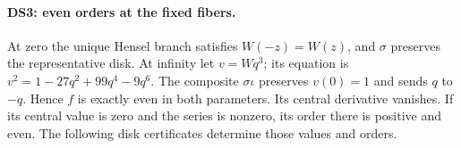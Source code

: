 \paragraph{DS3: even orders at the fixed fibers.}
At zero the unique Hensel branch satisfies $W(-z)=W(z)$, and $\sigma$
preserves the representative disk. At infinity let $v=Wq^3$; its equation
is $v^2=1-27q^2+99q^4-9q^6$. The composite $\sigma\iota$ preserves
$v(0)=1$ and sends $q$ to $-q$. Hence $f$ is exactly even in both
parameters. Its central derivative vanishes. If its central value is
zero and the series is nonzero, its order there is positive and even.
The following disk certificates determine those values and orders.
